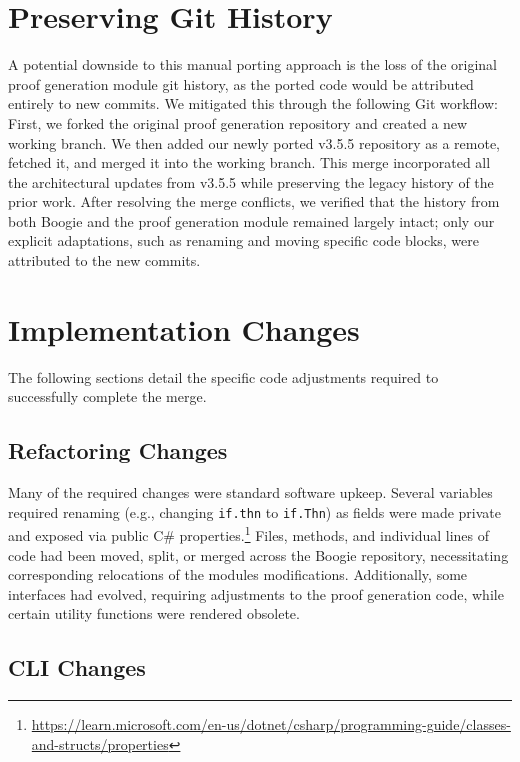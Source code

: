\section{Preserving Git History}

A potential downside to this manual porting approach is the loss of the original proof generation module git history,
as the ported code would be attributed entirely to new commits.
We mitigated this through the following Git workflow:
First, we forked the original proof generation repository and created a new working branch.
We then added our newly ported v3.5.5 repository as a remote, fetched it, and merged it into the working branch.
This merge incorporated all the architectural updates from v3.5.5 while preserving the legacy history of the prior work.
After resolving the merge conflicts, we verified that the history from both Boogie and the proof generation module remained largely intact;
only our explicit adaptations, such as renaming and moving specific code blocks, were attributed to the new commits.

\section{Implementation Changes}

The following sections detail the specific code adjustments required to successfully complete the merge.

\subsection{Refactoring Changes}

Many of the required changes were standard software upkeep.
Several variables required renaming (e.g., changing \texttt{if.thn} to \texttt{if.Thn})
as fields were made private and exposed via public C\# properties.\footnote{\url{https://learn.microsoft.com/en-us/dotnet/csharp/programming-guide/classes-and-structs/properties}}
Files, methods, and individual lines of code had been moved, split, or merged across the Boogie repository,
necessitating corresponding relocations of the modules modifications.
Additionally, some interfaces had evolved, requiring adjustments to the proof generation code, while certain utility functions were rendered obsolete.

\subsection{CLI Changes}

